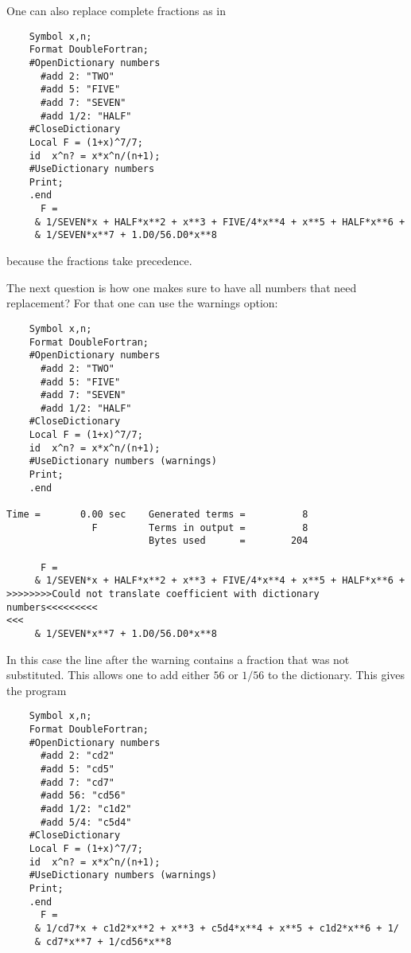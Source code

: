 One can also replace complete fractions as in
\begin{verbatim}
    Symbol x,n;
    Format DoubleFortran;
    #OpenDictionary numbers
      #add 2: "TWO"
      #add 5: "FIVE"
      #add 7: "SEVEN"
      #add 1/2: "HALF"
    #CloseDictionary
    Local F = (1+x)^7/7;
    id  x^n? = x*x^n/(n+1);
    #UseDictionary numbers
    Print;
    .end
      F =
     & 1/SEVEN*x + HALF*x**2 + x**3 + FIVE/4*x**4 + x**5 + HALF*x**6 + 
     & 1/SEVEN*x**7 + 1.D0/56.D0*x**8
\end{verbatim}
because the fractions take precedence.

The next question is how one makes sure to have all numbers that need 
replacement? For that one can use the warnings option:
\begin{verbatim}
    Symbol x,n;
    Format DoubleFortran;
    #OpenDictionary numbers
      #add 2: "TWO"
      #add 5: "FIVE"
      #add 7: "SEVEN"
      #add 1/2: "HALF"
    #CloseDictionary
    Local F = (1+x)^7/7;
    id  x^n? = x*x^n/(n+1);
    #UseDictionary numbers (warnings)
    Print;
    .end

Time =       0.00 sec    Generated terms =          8
               F         Terms in output =          8
                         Bytes used      =        204

      F =
     & 1/SEVEN*x + HALF*x**2 + x**3 + FIVE/4*x**4 + x**5 + HALF*x**6 + 
>>>>>>>>Could not translate coefficient with dictionary numbers<<<<<<<<<
<<<
     & 1/SEVEN*x**7 + 1.D0/56.D0*x**8
\end{verbatim}
In this case the line after the warning contains a fraction that was not 
substituted. This allows one to add either $56$ or $1/56$ to the 
dictionary. This gives the program
\begin{verbatim}
    Symbol x,n;
    Format DoubleFortran;
    #OpenDictionary numbers
      #add 2: "cd2"
      #add 5: "cd5"
      #add 7: "cd7"
      #add 56: "cd56"
      #add 1/2: "c1d2"
      #add 5/4: "c5d4"
    #CloseDictionary
    Local F = (1+x)^7/7;
    id  x^n? = x*x^n/(n+1);
    #UseDictionary numbers (warnings)
    Print;
    .end
      F =
     & 1/cd7*x + c1d2*x**2 + x**3 + c5d4*x**4 + x**5 + c1d2*x**6 + 1/
     & cd7*x**7 + 1/cd56*x**8
\end{verbatim}
